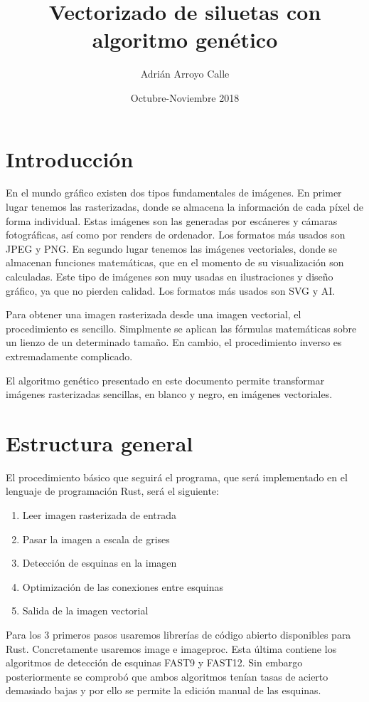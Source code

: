 \documentclass{report}
\title{Vectorizado de siluetas con algoritmo genético}
\author{Adrián Arroyo Calle}
\date{ Octubre-Noviembre 2018}
\begin{document}
\maketitle

\chapter{Introducción}
En el mundo gráfico existen dos tipos fundamentales de imágenes.
En primer lugar tenemos las rasterizadas, donde se almacena la información de cada píxel de forma individual.
Estas imágenes son las generadas por escáneres y cámaras fotográficas, así como por renders
de ordenador. Los formatos más usados son JPEG y PNG. En segundo lugar tenemos las imágenes
vectoriales, donde se almacenan funciones matemáticas, que en el momento de su visualización son calculadas. 
Este tipo de imágenes son muy usadas en ilustraciones y diseño gráfico, ya que no pierden calidad. Los formatos más usados son SVG y AI. 

Para obtener una imagen rasterizada desde una imagen vectorial, el procedimiento es
sencillo. Simplmente se aplican las fórmulas matemáticas sobre un lienzo de un determinado
tamaño. En cambio, el procedimiento inverso es extremadamente complicado. 

El algoritmo genético presentado en este documento permite transformar imágenes rasterizadas
sencillas, en blanco y negro, en imágenes vectoriales.

\chapter{Estructura general}

El procedimiento básico que seguirá el programa, que será implementado en el lenguaje 
de programación Rust\cite{Matsakis:2014:RL:2692956.2663188}, será el siguiente:

\begin{enumerate}
	\item Leer imagen rasterizada de entrada
	\item Pasar la imagen a escala de grises
	\item Detección de esquinas en la imagen
	\item Optimización de las conexiones entre esquinas
	\item Salida de la imagen vectorial
\end{enumerate}

Para los 3 primeros pasos usaremos librerías de código abierto disponibles para Rust. Concretamente
usaremos image e imageproc. Esta última contiene los algoritmos de detección de esquinas FAST9 y 
FAST12. Sin embargo posteriormente se comprobó que ambos algoritmos tenían tasas de acierto
demasiado bajas y por ello se permite la edición manual de las esquinas.
\end{document}
